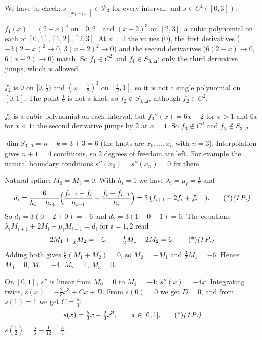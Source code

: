 \begin{solution}
We have to check: $s|_{[x_j,x_{j+1}]}\in\mathcal P_3$ for every interval, and $s\in C^2([0,3])$.

 $f_1(x)=(2-x)^3$ on $[0,2]$ and $(x-2)^3$ on $[2,3]$, a cubic polynomial on each of $[0,1],[1,2],[2,3]$. At $x=2$ the values ($0$), the first derivatives ($-3(2-x)^2\to0$, $3(x-2)^2\to0$) and the second derivatives ($6(2-x)\to0$, $6(x-2)\to0$) match. So $f_1\in C^2$ and $f_1\in S_{3,\Delta}$; only the third derivative jumps, which is allowed. 

$f_2$ is $0$ on $[0,\frac12)$ and $(x-\frac12)^3$ on $[\frac12,1]$, so it is not a single polynomial on $[0,1]$. The point $\frac12$ is not a knot, so $f_2\notin S_{3,\Delta}$, although $f_2\in C^2$. 

$f_3$ is a cubic polynomial on each interval, but $f_3''(x)=6x+2$ for $x>1$ and $6x$ for $x<1$: the second derivative jumps by $2$ at $x=1$. So $f_3\notin C^2$ and $f_3\notin S_{3,\Delta}$. 

 $\dim S_{3,\Delta}=n+k=3+3=6$ (the knots are $x_0,\dots,x_n$ with $n=3$). 
Interpolation gives $n+1=4$ conditions, so $2$ degrees of freedom are left. For example the natural boundary conditions $s''(x_0)=s''(x_n)=0$ fix them. 

 Natural spline: $M_0=M_3=0$. With $h_i=1$ we have $\lambda_i=\mu_i=\frac12$ and
\[
d_i=\frac6{h_i+h_{i+1}}\Big(\frac{f_{i+1}-f_i}{h_{i+1}}-\frac{f_i-f_{i-1}}{h_i}\Big)=3\,(f_{i+1}-2f_i+f_{i-1}).\ptd{1}
\]
So $d_1=3(0-2+0)=-6$ and $d_2=3(1-0+1)=6$. 
The equations $\lambda_iM_{i+1}+2M_i+\mu_iM_{i-1}=d_i$ for $i=1,2$ read
\[
2M_1+\tfrac12M_2=-6,\qquad \tfrac12M_1+2M_2=6.\ptd{1}
\]
Adding both gives $\frac52(M_1+M_2)=0$, so $M_2=-M_1$ and $\frac32M_1=-6$. Hence
$M_0=0$, $M_1=-4$, $M_2=4$, $M_3=0$. 

 On $[0,1]$, $s''$ is linear from $M_0=0$ to $M_1=-4$: $s''(x)=-4x$. Integrating twice, $s(x)=-\frac23x^3+Cx+D$. From $s(0)=0$ we get $D=0$, and from $s(1)=1$ we get $C=\frac53$:
\[
s(x)=\tfrac53x-\tfrac23x^3,\qquad x\in[0,1].\ptd{1}
\]
$s(\frac12)=\frac56-\frac1{12}=\frac34$. 


\end{solution}
